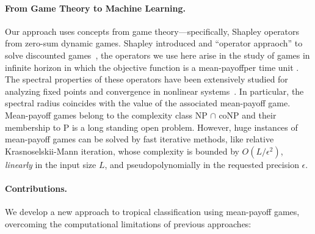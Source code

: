 \documentclass{article}
\begin{document}
\paragraph{From Game Theory to Machine Learning.} Our approach uses concepts from game theory—specifically, Shapley operators from zero-sum dynamic games. Shapley introduced and ``operator appraoch'' to solve discounted games~\cite{shapley1953}, the operators we use here arise in the study of games in infinite horizon in which the objective function is a mean-payoffper time unit \cite{zwick1996}.
The spectral properties of these operators have been extensively studied for analyzing fixed points and convergence in nonlinear systems~\cite{kolokoltsov1997,gaubert2004}. In particular, the spectral radius coincides with the value of the associated mean-payoff game. Mean-payoff games belong to the complexity class NP $\cap$ coNP and their
membership to P is a long standing open problem. However, huge instances of mean-payoff games
can be solved by fast iterative methods, like relative Krasnoselskii-Mann
iteration, whose complexity is bounded by $O(L/\epsilon^2)$, {\em linearly} in the input size $L$,
and pseudopolynomially in the requested precision $\epsilon$. 

\paragraph{Contributions.} We develop a new approach to tropical classification using mean-payoff games,
overcoming the computational limitations of previous approaches:
\end{document}
